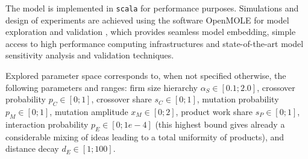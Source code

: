 \documentclass[letterpaper]{article}
\begin{document}



The model is implemented in \texttt{scala} for performance purposes. Simulations and design of experiments are achieved using the software OpenMOLE for model exploration and validation \citep{reuillon2013openmole}, which provides seamless model embedding, simple access to high performance computing infrastructures and state-of-the-art model sensitivity analysis and validation techniques.

Explored parameter space corresponds to, when not specified otherwise, the following parameters and ranges: firm size hierarchy $\alpha_S \in [0.1 ; 2.0]$, crossover probability $p_C \in [0 ; 1]$, crossover share $s_C \in [0 ; 1]$, mutation probability $p_M \in [0 ; 1]$, mutation amplitude $x_M \in [0 ; 2]$, product work share $s_P \in [0 ; 1]$, interaction probability $p_E \in [0 ; 1e-4]$ (this highest bound gives already a considerable mixing of ideas leading to a total uniformity of products), and distance decay $d_E \in [1 ; 100]$.
\end{document}
